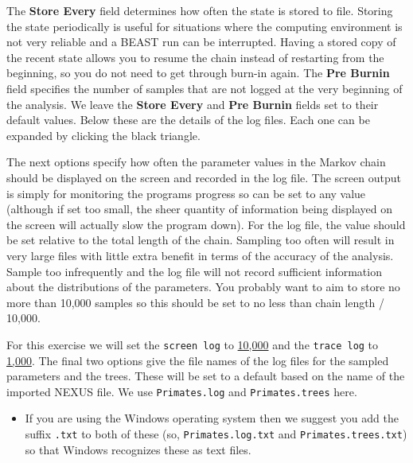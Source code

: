 \documentclass[12pt]{article}
\newcommand{\includeimage}[2][]{%
\texttt{[image: \#2]}
}
\newcommand{\logEvery}{{1,000}}
\newcommand{\screenEvery}{{10,000}}
\begin{document}

The \textbf{Store Every} field determines how often the state is stored to file. Storing
the state periodically is useful for situations where the computing environment
is not very reliable and a BEAST run can be interrupted. Having a stored copy
of the recent state allows you to resume the chain instead of restarting from the
beginning, so you do not need to get through burn-in again.
The \textbf{Pre Burnin} field specifies the number of samples that are not logged at the very beginning of
the analysis. We leave the \textbf{Store Every} and \textbf{Pre Burnin} fields set to their default
values. Below these are the details of the log files. Each one can be expanded by
clicking the black triangle.

The next options specify how often the parameter values in the Markov
chain should be displayed on the screen and recorded in the log file.
The screen output is simply for monitoring the programs progress so
can be set to any value (although if set too small, the sheer quantity
of information being displayed on the screen will actually slow the
program down). For the log file, the value should be set relative
to the total length of the chain. Sampling too often will result in
very large files with little extra benefit in terms of the accuracy
of the analysis. Sample too infrequently and the log file will not
record sufficient information about the distributions of the parameters. 
You probably want to aim to store no more than 10,000 samples so this should be
set to no less than chain length / 10,000.

For this exercise we will set the \texttt{screen log} to \underline{\screenEvery{}} and the \texttt{trace log} to \underline{\logEvery{}}. The final two
options give the file names of the log files for the sampled parameters and
the trees. These will be set to a default based on the name of the
imported NEXUS file. We use \texttt{Primates.log} and \texttt{Primates.trees} here.

\begin{itemize}
\item If you are using the Windows operating system then we suggest you add the suffix \texttt{.txt} to both of these (so,
\texttt{Primates.log.txt} and \texttt{Primates.trees.txt}) so that Windows recognizes
these as text files. 
\end{itemize}
\end{document}
